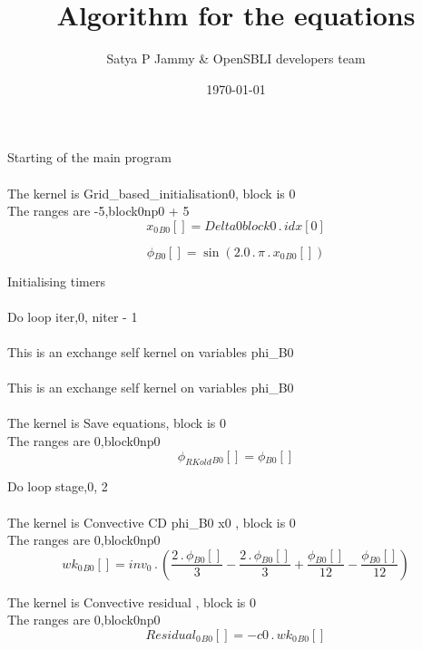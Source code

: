 \documentclass{article}
\title{Algorithm for the equations}
\author{Satya P Jammy \& OpenSBLI developers team}
\date{\today}
\begin{document}
\maketitle
\noindent Starting of the main program\\
\\\noindent The kernel is Grid_based_initialisation0, block is 0\\\noindent The ranges are -5,block0np0 + 5\\\begin{dmath}{x_{0}{_{B0}}}[{}] = Delta0block0 \,.\, {idx}[{0}]\end{dmath}

\begin{dmath}{\phi{_{B0}}}[{}] = \sin{\left (2.0 \,.\, \pi \,.\, {x_{0}{_{B0}}}[{}] \right )}\end{dmath}

\noindent Initialising timers\\
\\\noindent Do loop iter,0, niter - 1\\
\\\noindent This is an exchange self kernel on variables phi_B0\\\\\noindent This is an exchange self kernel on variables phi_B0\\\\\noindent The kernel is Save equations, block is 0\\\noindent The ranges are 0,block0np0\\\begin{dmath}{\phi_{RKold}{_{B0}}}[{}] = {\phi{_{B0}}}[{}]\end{dmath}

\noindent Do loop stage,0, 2\\
\\\noindent The kernel is Convective CD phi_B0 x0 , block is 0\\\noindent The ranges are 0,block0np0\\\begin{dmath}{wk_{0}{_{B0}}}[{}] = inv_0 \,.\, \left(\frac{2 \,.\, {\phi{_{B0}}}[{}]}{3} - \frac{2 \,.\, {\phi{_{B0}}}[{}]}{3} + \frac{{\phi{_{B0}}}[{}]}{12} - \frac{{\phi{_{B0}}}[{}]}{12}\right)\end{dmath}

\noindent The kernel is Convective residual , block is 0\\\noindent The ranges are 0,block0np0\\\begin{dmath}{Residual_{0}{_{B0}}}[{}] = - c0 \,.\, {wk_{0}{_{B0}}}[{}]\end{dmath}
\end{document}
